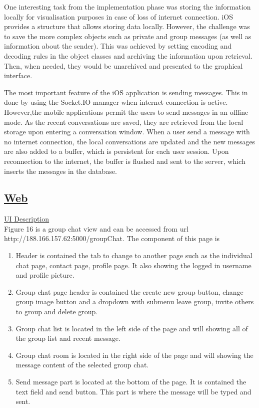 \documentclass{article}
\begin{document}
\begin{enumerate}
	One interesting task from the implementation phase was storing the information locally for visualisation purposes in case of loss of internet connection. iOS provides a structure that allows storing data locally. However, the challenge was to save the more complex objects such as private and group messages (as well as information about the sender). This was achieved by setting encoding and decoding rules in the object classes and archiving the information upon retrieval. Then, when needed, they
	would be unarchived and presented to the graphical interface.
	
	The most important feature of the iOS application is sending messages. This in done by using the Socket.IO manager when internet connection is active. However,the mobile applications permit the users to send messages in an offline mode. As the recent conversations are saved, they are retrieved from the local storage upon entering a conversation window. When a user send a message with no internet connection, the local conversations are updated and the new messages are also added to a buffer, which is persistent for each user session. Upon reconnection to the internet, the buffer is flushed and sent to the server, which inserts the messages in the database.\par
	
	
	\subsection{\underline{\textbf{Web}}}

	\underline{UI Description}\\
			
	Figure 16 is a group chat view and can be accessed from url \\ http://188.166.157.62:5000/groupChat. The component of this page is
		
	\begin{enumerate}
		\item
			Header is contained the tab to change to another page such as the individual chat page, contact page, profile page. It also showing the logged in username and profile picture.
		\item
		Group chat page header is contained the create new group button, change group image button and a dropdown with submenu leave group, invite others to group and delete group.
		\item
		Group chat list is located in the left side of the page and will showing all of the group list and recent message.
		\item
		Group chat room is located in the right side of the page and will showing the message content of the selected group chat.
		\item
			Send message part is located at the bottom of the page. It is contained the text field and send button. This part is where the message will be typed and sent.
	\end{enumerate}
		

\end{enumerate}
\end{document}
